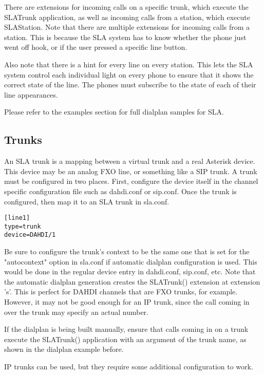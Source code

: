 There are extensions for incoming calls on a specific trunk, which execute the SLATrunk
application, as well as incoming calls from a station, which execute SLAStation.
Note that there are multiple extensions for incoming calls from a station.  This is
because the SLA system has to know whether the phone just went off hook, or if the
user pressed a specific line button.

Also note that there is a hint for every line on every station.  This lets the SLA
system control each individual light on every phone to ensure that it shows the
correct state of the line.  The phones must subscribe to the state of each of their
line appearances.

Please refer to the examples section for full dialplan samples for SLA.

\subsection{Trunks}
\label{trunks}

An SLA trunk is a mapping between a virtual trunk and a real Asterisk device.
This device may be an analog FXO line, or something like a SIP trunk.  A trunk
must be configured in two places.  First, configure the device itself in the
channel specific configuration file such as dahdi.conf or sip.conf.  Once the
trunk is configured, then map it to an SLA trunk in sla.conf.
\begin{astlisting}
\begin{verbatim}
[line1]
type=trunk
device=DAHDI/1
\end{verbatim}
\end{astlisting}

Be sure to configure the trunk's context to be the same one that is set for the
"autocontext" option in sla.conf if automatic dialplan configuration is used.
This would be done in the regular device entry in dahdi.conf, sip.conf, etc.
Note that the automatic dialplan generation creates the SLATrunk() extension
at extension 's'.  This is perfect for DAHDI channels that are FXO trunks, for
example.  However, it may not be good enough for an IP trunk, since the call
coming in over the trunk may specify an actual number.

If the dialplan is being built manually, ensure that calls coming in on a trunk
execute the SLATrunk() application with an argument of the trunk name, as shown
in the dialplan example before.

IP trunks can be used, but they require some additional configuration to work.

